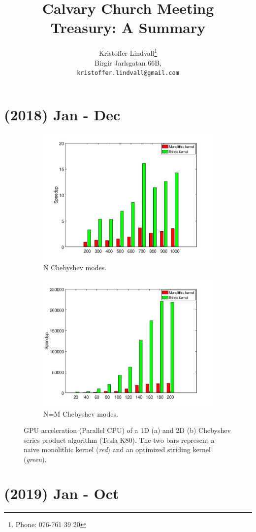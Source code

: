 \documentclass{article}
\date{\displaydate{date}}
\title{Calvary Church Meeting \\
\large Treasury: A Summary}
\author{
  Kristoffer Lindvall\thanks{Phone: 076-761 39 20} \\
  Birgir Jarlsgatan 66B, \\
  \texttt{kristoffer.lindvall@gmail.com} \\
}
\begin{document}
\maketitle



\section{(2018) Jan - Dec}

\begin{figure}[H]
  \centering
  \begin{subfigure}{.48\textwidth}
		\includegraphics[width=\textwidth]{1Dparx.jpg}
		\caption{N Chebyshev modes.}
	\end{subfigure}
	\begin{subfigure}{.48\textwidth}
		\includegraphics[width=\textwidth]{2Dpar.jpg}
		\caption{N=M Chebyshev modes.}
	\end{subfigure}
  \caption{GPU acceleration (Parallel CPU) of a 1D (a) and 2D (b) Chebyshev series product algorithm (Tesla K80). The two bars represent a naive monolithic kernel (\textit{red}) and an optimized striding kernel (\textit{green}).}
  \label{fig:fig1}
\end{figure}

\section{(2019) Jan - Oct}
\end{document}
